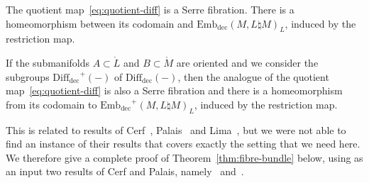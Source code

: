 \documentclass[AHL,Unicode,published]{cedram}
\newcommand{\Int}{\mathring}
\newcommand{\rdec}{\mathrm{dec}}
\newcommand{\diffdec}{\ensuremath{\mathrm{Diff}_{\rdec}}}
\newcommand{\embdec}{\ensuremath{\mathrm{Emb}_{\rdec}}}
\begin{document}
\begin{theo}\label{thm:fibre-bundle}
The quotient map~\eqref{eq:quotient-diff} is a Serre fibration. There is a homeomorphism between its codomain and $\embdec(M,L \natural M)_L$, induced by the restriction map.

If the submanifolds $A \subset \Int{L}$ and $B \subset \Int{M}$ are oriented and we consider the subgroups $\diffdec^{+}(-)$ of $\diffdec(-)$, then the analogue of the quotient map~\eqref{eq:quotient-diff} is also a Serre fibration and there is a homeomorphism from its codomain to $\embdec^{+}(M,L \natural M)_L$, induced by the restriction map.
\end{theo}

\begin{rema}
This is related to results of Cerf~\cite[p.~294, \S~II.2.2.2, Cor.~2]{Cerf1961Topologiedecertains}, Palais~\cite[Th.~B]{Palais1960Localtrivialityof} and Lima~\cite{Lima1963localtrivialityof}, but we were not able to find an instance of their results that covers exactly the setting that we need here. We therefore give a complete proof of Theorem~\ref{thm:fibre-bundle} below, using as an input two results of Cerf and Palais, namely~\cite[Lemme~II.2.1.2 (p.~291)]{Cerf1961Topologiedecertains} and~\cite[Th.~A]{Palais1960Localtrivialityof}.
\end{rema}
\end{document}
